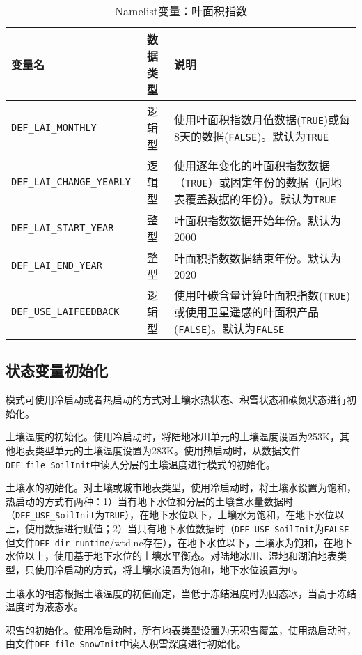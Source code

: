 \begin{table}[!htbp] \small
\caption{Namelist变量：叶面积指数}
\label{table_nl_lai}
\centering \renewcommand{\arraystretch}{1.5}
\begin{tabular}{lcp{}}
\toprule
\textbf{变量名} & \textbf{数据类型} & \textbf{说明} \\\midrule
\texttt{DEF\_LAI\_MONTHLY} & 逻辑型 & 使用叶面积指数月值数据(\texttt{TRUE})或每8天的数据(\texttt{FALSE})。默认为\texttt{TRUE}\\
\texttt{DEF\_LAI\_CHANGE\_YEARLY}  & 逻辑型 & 使用逐年变化的叶面积指数数据（\texttt{TRUE}）或固定年份的数据（同地表覆盖数据的年份）。默认为\texttt{TRUE} \\
\texttt{DEF\_LAI\_START\_YEAR} & 整型 & 叶面积指数数据开始年份。默认为2000\\
\texttt{DEF\_LAI\_END\_YEAR} & 整型 & 叶面积指数数据结束年份。默认为2020\\
\texttt{DEF\_USE\_LAIFEEDBACK} & 逻辑型 & 使用叶碳含量计算叶面积指数(\texttt{TRUE})或使用卫星遥感的叶面积产品(\texttt{FALSE})。默认为\texttt{FALSE} \\
\bottomrule
\end{tabular}
\end{table}


\subsection{状态变量初始化}

模式可使用冷启动或者热启动的方式对土壤水热状态、积雪状态和碳氮状态进行初始化。

土壤温度的初始化。使用冷启动时，将陆地冰川单元的土壤温度设置为253K，其他地表类型单元的土壤温度设置为283K。使用热启动时，从数据文件\texttt{DEF\_file\_SoilInit}中读入分层的土壤温度进行模式的初始化。

土壤水的初始化。对土壤或城市地表类型，使用冷启动时，将土壤水设置为饱和，热启动的方式有两种：1）当有地下水位和分层的土壤含水量数据时（\texttt{DEF\_USE\_SoilInit}为\texttt{TRUE}），在地下水位以下，土壤水为饱和，在地下水位以上，使用数据进行赋值；2）当只有地下水位数据时（\texttt{DEF\_USE\_SoilInit}为\texttt{FALSE}但文件\texttt{DEF\_dir\_runtime}/wtd.nc存在），在地下水位以下，土壤水为饱和，在地下水位以上，使用基于地下水位的土壤水平衡态。对陆地冰川、湿地和湖泊地表类型，只使用冷启动的方式，将土壤水设置为饱和，地下水位设置为0。

土壤水的相态根据土壤温度的初值而定，当低于冻结温度时为固态冰，当高于冻结温度时为液态水。

积雪的初始化。使用冷启动时，所有地表类型设置为无积雪覆盖，使用热启动时，由文件\texttt{DEF\_file\_SnowInit}中读入积雪深度进行初始化。


